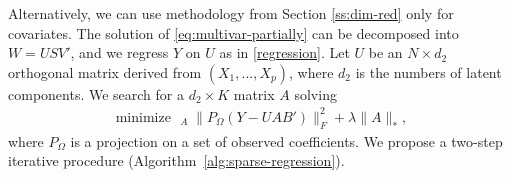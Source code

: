 \documentclass[preprint]{imsart}
\numberwithin{equation}{section}
\theoremstyle{plain}
\DeclareMathOperator*{\argmin}{arg\,min}
\DeclareMathOperator*{\minimize}{minimize\ \ }
\begin{document}
Alternatively, we can use methodology from Section \ref{ss:dim-red} only for covariates. The solution of \eqref{eq:multivar-partially} can be decomposed into $W = USV'$, and we regress $Y$ on $U$ as in \eqref{regression}.
Let $U$ be an $N \times d_2$ orthogonal matrix derived from $(X_1,...,X_p)$, where $d_2$ is the numbers of latent components. We search for a $d_2 \times K$ matrix $A$ solving
\begin{align}\label{eq:pcr}
\minimize_{A} \|P_\Omega(Y - UAB')\|_F^2 + \lambda\|A\|_*,
\end{align}
where $P_\Omega$ is a projection on a set of observed coefficients.
We propose a two-step iterative procedure (Algorithm~\ref{alg:sparse-regression}).



\end{document}
